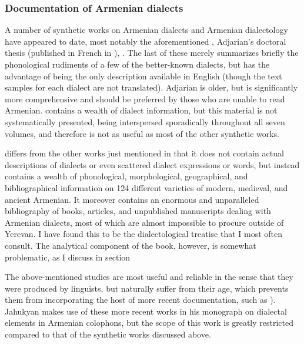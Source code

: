 \subsubsection{ Documentation of Armenian dialects}


A number of synthetic works on Armenian dialects and Armenian dialectology have appeared to date, most notably the aforementioned , Adjarian’s doctoral thesis (published in French in ), . The last of these merely summarizes briefly the phonological rudiments of a few of the better-known dialects, but has the advantage of being the only description available in English (though the text samples for each dialect are not translated). Adjarian  is older, but is significantly more comprehensive and should be preferred by those who are unable to read Armenian.  contains a wealth of dialect information, but this material is not systematically presented, being interspersed sporadically throughout all seven volumes, and therefore is not as useful as most of the other synthetic works.

 differs from the other works just mentioned in that it does not contain actual descriptions of dialects or even scattered dialect expressions or words, but instead contains a wealth of phonological, morphological, geographical, and bibliographical information on 124 different varieties of modern, medieval, and ancient Armenian. It moreover contains an enormous and unparalleled bibliography of books, articles, and unpublished manuscripts dealing with Armenian dialects, most of which are almost impossible to procure outside of Yerevan.  I have found this to be the dialectological treatise that I most often consult. The analytical component of the book, however, is somewhat problematic, as I discuss in section 

The above-mentioned studies are most useful and reliable in the sense that they were produced by linguists, but naturally suffer from their age, which prevents them from incorporating the host of more recent documentation, such as ). Jahukyan makes use of these more recent works in his  monograph on dialectal elements in Armenian colophons, but the scope of this work is greatly restricted compared to that of the synthetic works discussed above.

